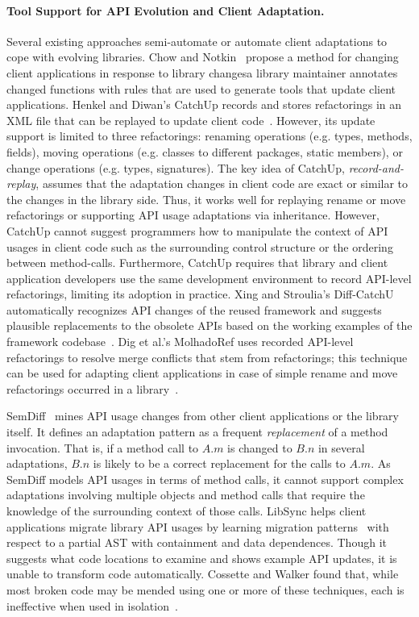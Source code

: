 \paragraph{{Tool Support for API Evolution and Client Adaptation.}} 
Several existing approaches semi-automate or automate client adaptations to cope with evolving libraries.  Chow and Notkin~\cite{Chow1996} propose a method for changing client applications in response to library changes\textemdash a library maintainer annotates changed functions with rules that are used to generate tools that update client applications. Henkel and Diwan's CatchUp records and stores refactorings in an XML file that can be replayed to update client code~\cite{Henkel2005}. However, its update support is limited to three refactorings: renaming operations (e.g.  types, methods, fields), moving operations (e.g. classes to different packages, static members), or change operations (e.g. types, signatures). The key idea of CatchUp, {\em record-and-replay}, assumes that the adaptation changes in client code are exact or similar to the changes in the library side. Thus, it works well for replaying rename or move refactorings or supporting API usage adaptations via inheritance. However, CatchUp cannot suggest programmers how to manipulate the context of API usages in client code such as the surrounding control structure or the ordering between method-calls. Furthermore, CatchUp requires that library and client application developers use the same development environment to record API-level refactorings, limiting its adoption in practice. Xing and Stroulia's Diff-CatchU automatically recognizes API changes of the reused framework and suggests plausible replacements to the obsolete APIs based on the working examples of the framework codebase~\cite{Xing2007:diffcatchup}. Dig et al.'s MolhadoRef uses recorded API-level refactorings to resolve merge conflicts that stem from refactorings; this technique can be used for adapting client applications in case of simple rename and move refactorings occurred in a library~\cite{Dig2007}.  

SemDiff~\cite{Dagenais2008:RAC} mines API usage changes from other client applications or the library itself.  It defines an adaptation pattern as a frequent {\em replacement} of a method invocation. That is, if a method call to $A.m$ is changed to $B.n$ in several adaptations, $B.n$ is likely to be a correct replacement for the calls to $A.m$. As SemDiff models API usages in terms of method calls, it cannot support complex adaptations involving multiple objects and method calls that require the knowledge of the surrounding context of those calls. LibSync helps client applications migrate library API usages by learning migration patterns~\cite{Nguyen2010:GAA} with respect to a partial AST with containment and data dependences. Though it suggests what code locations to examine and shows example API updates, it is {unable} to transform code automatically. Cossette and Walker found that, while most broken code may be mended using one or more of these techniques, each is ineffective when used in isolation~\cite{cossette2012}. 

